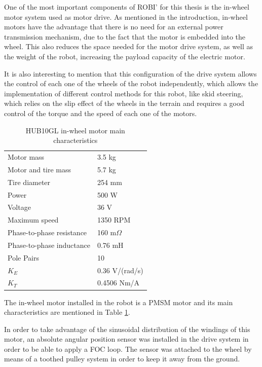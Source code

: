One of the most important components of ROBI' for this thesis is the in-wheel motor system used as motor drive. As mentioned in the introduction, in-wheel motors have the advantage that there is no need for an external power transmission mechanism, due to the fact that the motor is embedded into the wheel. This also reduces the space needed for the motor drive system, as well as the weight of the robot, increasing the payload capacity of the electric motor.

It is also interesting to mention that this configuration of the drive system allows the control of each one of the wheels of the robot independently, which allows the implementation of different control methods for this robot, like skid steering, which relies on the slip effect of the wheels in the terrain and requires a good control of the torque and the speed of each one of the motors.

\begin{table}[]
\centering
\caption{HUB10GL in-wheel motor main characteristics}
\label{table:hub10}
\begin{tabular}{@{}ll@{}}
\toprule
Motor mass                & 3.5 kg   \\
Motor and tire mass       & 5.7 kg   \\
Tire diameter             & 254 mm   \\ 
Power                     & 500 W    \\
Voltage                   & 36 V     \\
Maximum speed             & 1350 RPM \\
Phase-to-phase resistance & 160 m$\Omega$\\
Phase-to-phase inductance & 0.76 mH \\
Pole Pairs				  & 10		\\
$K_{E}$					  & 0.36 V/(rad/s) \\
$K_{T}$					  & 0.4506 Nm/A \\
\bottomrule
\end{tabular}
\end{table}

The in-wheel motor installed in the robot is a \ac{PMSM} motor and its main characteristics are mentioned in Table \ref{table:hub10}. 

In order to take advantage of the sinusoidal distribution of the windings of this motor, an absolute angular position sensor was installed in the drive system in order to be able to apply a \ac{FOC} loop. The sensor was attached to the wheel by means of a toothed pulley system in order to keep it away from the ground.

